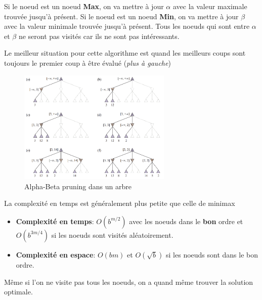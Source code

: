 Si le noeud est un noeud \textbf{Max}, on va mettre à jour $\alpha$ avec la valeur maximale trouvée jusqu'à présent. 
Si le noeud est un noeud \textbf{Min}, on va mettre à jour $\beta$ avec la valeur minimale trouvée jusqu'à présent. 
Tous les noeuds qui sont entre $\alpha$ et $\beta$ ne seront pas visités car ils ne sont pas intéressants.

\begin{remark}\leavevmode
    Le meilleur situation pour cette algorithme est quand les meilleurs coups sont toujours le 
    premier coup à être évalué (\textit{plus à gauche})
\end{remark}

\begin{figure}[H]
    \begin{center}
        \includegraphics[width=0.65\textwidth]{./pictures/alphabeta.png}
    \end{center}
    \caption{Alpha-Beta pruning dans un arbre}\label{fig:alphabeta} 
\end{figure}

\begin{remark}\leavevmode
    La complexité en temps est généralement plus petite que celle de minimax
    \begin{itemize}
        \item \textbf{Complexité en temps}: $O(b^{m/2})$ avec les noeuds dans le \textbf{bon} ordre
            et $O(b^{3m/4})$ si les noeuds sont visités aléatoirement.
        \item \textbf{Complexité en espace}: $O(bm)$ et $O(\sqrt{b})$ si les noeuds sont dans le bon ordre.
    \end{itemize}
\end{remark}

\begin{note}
    Même si l'on ne visite pas tous les noeuds, on a quand même trouver la solution optimale.
\end{note}

